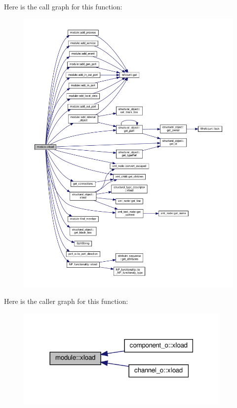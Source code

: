 Here is the call graph for this function\+:
\nopagebreak
\begin{figure}[H]
\begin{center}
\leavevmode
\includegraphics[width=350pt]{d0/dd3/classmodule_a069e785275775557f2f1b1b276bfb524_cgraph}
\end{center}
\end{figure}
Here is the caller graph for this function\+:
\nopagebreak
\begin{figure}[H]
\begin{center}
\leavevmode
\includegraphics[width=297pt]{d0/dd3/classmodule_a069e785275775557f2f1b1b276bfb524_icgraph}
\end{center}
\end{figure}
\mbox{\label{classmodule_acd60f65d5beaeed8a6728ea1cb506b74}} 
